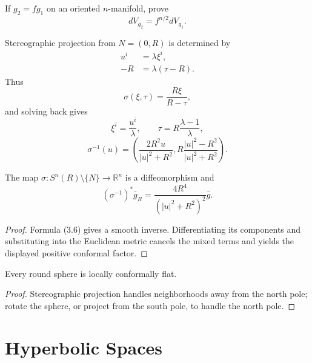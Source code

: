 \begin{exercise}\label{exer:conformal-volume-forms}
If $g_2=fg_1$ on an oriented $n$-manifold, prove
\[
dV_{g_2}=f^{n/2}dV_{g_1}.
\]
\end{exercise}

Stereographic projection from $N=(0,R)$ is determined by
\begin{align*}
u^i&=\lambda\xi^i,\\
-R&=\lambda(\tau-R).
\tag{3.3}
\end{align*}
Thus
\begin{equation}
\sigma(\xi,\tau)=\frac{R\xi}{R-\tau},\tag{3.4}
\end{equation}
and solving back gives
\begin{equation}
\xi^i=\frac{u^i}{\lambda},\qquad \tau=R\frac{\lambda-1}{\lambda},\tag{3.5}
\end{equation}
\begin{equation}
\sigma^{-1}(u)=\left(\frac{2R^2u}{|u|^2+R^2},R\frac{|u|^2-R^2}{|u|^2+R^2}\right).\tag{3.6}
\end{equation}

\begin{proposition}
\label{prop:stereographic-conformal-diffeomorphism}
The map $\sigma:S^n(R)\setminus\{N\}\to\mathbb R^n$ is a diffeomorphism and
\[
(\sigma^{-1})^*\bar g_R=\frac{4R^4}{(|u|^2+R^2)^2}\bar g.
\]
\end{proposition}
\begin{proof}
\sketch Formula (3.6) gives a smooth inverse. Differentiating its components and substituting into the Euclidean metric cancels the mixed terms and yields the displayed positive conformal factor.
\end{proof}

\begin{corollary}
\label{cor:sphere-round-metric-locally-conformally-flat}
Every round sphere is locally conformally flat.
\end{corollary}
\begin{proof}
\sketch Stereographic projection handles neighborhoods away from the north pole; rotate the sphere, or project from the south pole, to handle the north pole.
\end{proof}

\section{Hyperbolic Spaces}

